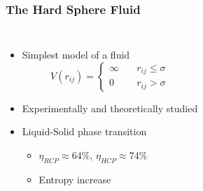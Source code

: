 \documentclass[smaller,notes=hide]{beamer}
\newlength{\wideitemsep}
\let\olditem\item
\renewcommand{\item}{\setlength{\itemsep}{\wideitemsep}\olditem}
\begin{document}
\begin{frame}
\frametitle{The Hard Sphere Fluid}
\begin{columns}
\begin{itemize}
\item Simplest model of a fluid
\begin{equation*}
\label{eqn:hs_potential}
V(r_{ij})=%
\begin{cases}
\infty \quad & r_{ij} \le \sigma \\
0 \quad & r_{ij} > \sigma
\end{cases}
\end{equation*}
\vspace{-0.10cm}
\item Experimentally and theoretically studied
\vspace{0.25cm}
\item Liquid-Solid phase transition
\begin{itemize}
\item $\eta_{RCP} \approx{64\%}$,  $\eta_{HCP} \approx{74\%}$ %
\item Entropy increase
\end{itemize}
\end{itemize}




\end{columns}
\end{frame}
\end{document}
